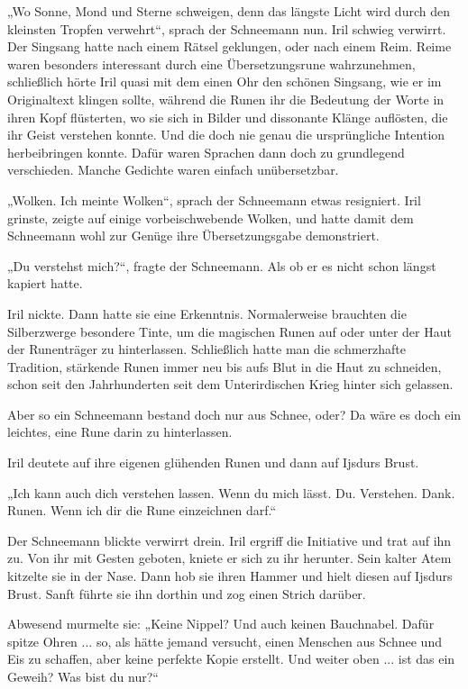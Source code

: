 „Wo Sonne, Mond und Sterne schweigen, denn das längste Licht wird durch den kleinsten Tropfen verwehrt“, sprach der Schneemann nun. Iril schwieg verwirrt. Der Singsang hatte nach einem Rätsel geklungen, oder nach einem Reim. Reime waren besonders interessant durch eine Übersetzungsrune wahrzunehmen, schließlich hörte Iril quasi mit dem einen Ohr den schönen Singsang, wie er im Originaltext klingen sollte, während die Runen ihr die Bedeutung der Worte in ihren Kopf flüsterten, wo sie sich in Bilder und dissonante Klänge auflösten, die ihr Geist verstehen konnte. Und die doch nie genau die ursprüngliche Intention herbeibringen konnte. Dafür waren Sprachen dann doch zu grundlegend verschieden. Manche Gedichte waren einfach unübersetzbar.

„Wolken. Ich meinte Wolken“, sprach der Schneemann etwas resigniert. Iril grinste, zeigte auf einige vorbeischwebende Wolken, und hatte damit dem Schneemann wohl zur Genüge ihre Übersetzungsgabe demonstriert.

„Du verstehst mich?“, fragte der Schneemann. Als ob er es nicht schon längst kapiert hatte.

Iril nickte. Dann hatte sie eine Erkenntnis. Normalerweise brauchten die Silberzwerge besondere Tinte, um die magischen Runen auf oder unter der Haut der Runenträger zu hinterlassen. Schließlich hatte man die schmerzhafte Tradition, stärkende Runen immer neu bis aufs Blut in die Haut zu schneiden, schon seit den Jahrhunderten seit dem Unterirdischen Krieg hinter sich gelassen.

Aber so ein Schneemann bestand doch nur aus Schnee, oder? Da wäre es doch ein leichtes, eine Rune darin zu hinterlassen.

Iril deutete auf ihre eigenen glühenden Runen und dann auf Ijsdurs Brust.

„Ich kann auch dich verstehen lassen. Wenn du mich lässt. Du. Verstehen. Dank. Runen. Wenn ich dir die Rune einzeichnen darf.“

Der Schneemann blickte verwirrt drein. Iril ergriff die Initiative und trat auf ihn zu. Von ihr mit Gesten geboten, kniete er sich zu ihr herunter. Sein kalter Atem kitzelte sie in der Nase. Dann hob sie ihren Hammer und hielt diesen auf Ijsdurs Brust. Sanft führte sie ihn dorthin und zog einen Strich darüber.

Abwesend murmelte sie: „Keine Nippel? Und auch keinen Bauchnabel. Dafür spitze Ohren ... so, als hätte jemand versucht, einen Menschen aus Schnee und Eis zu schaffen, aber keine perfekte Kopie erstellt. Und weiter oben ... ist das ein Geweih? Was bist du nur?“


